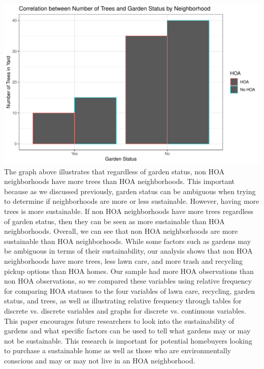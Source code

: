 \documentclass{article}
\begin{document}
\includegraphics{exam1-020}
\newline
The graph above illustrates that regardless of garden status, non HOA neighborhoods have more trees than HOA neighborhoods. This important because as we discussed previously, garden status can be ambiguous when trying to determine if neighborhoods are more or less sustainable. However, having more trees is more sustainable. If non HOA neighborhoods have more trees regardless of garden status, then they can be seen as more sustainable than HOA neighborhoods.
\newline
Overall, we can see that non HOA neighborhoods are more sustainable than HOA neighborhoods. While some factors such as gardens may be ambiguous in terms of their sustainability, our analysis shows that non HOA neighborhoods have more trees, less lawn care, and more trash and recycling pickup options than HOA homes. Our sample had more HOA observations than non HOA observations, so we compared these variables using relative frequency for comparing HOA statuses to the four variables of lawn care, recycling, garden status, and trees, as well as illustrating relative frequency through tables for discrete vs. discrete variables and graphs for discrete vs. continuous variables. This paper encourages future researchers to look into the sustainability of gardens and what specific factors can be used to tell what gardens may or may not be sustainable. This research is important for potential homebuyers looking to purchase a sustainable home as well as those who are environmentally conscious and may or may not live in an HOA neighborhood.

\newpage

\end{document}
